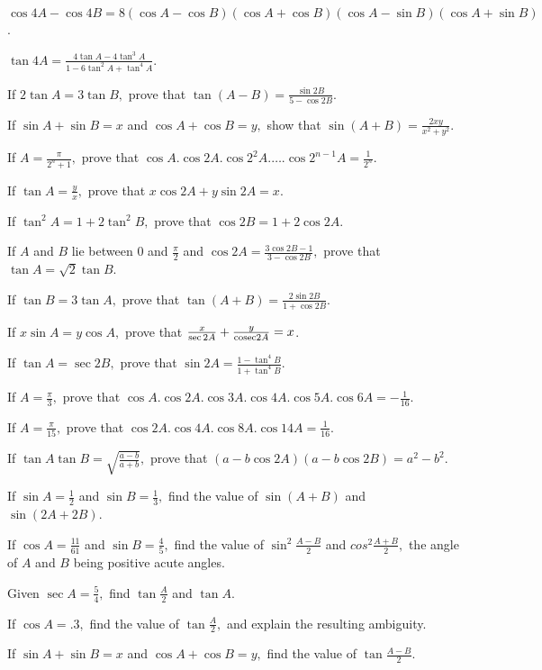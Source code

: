 \item $\cos 4A - \cos 4B = 8(\cos A - \cos B)(\cos A + \cos B)(\cos A - \sin B)(\cos A + \sin B)$.
\item $\tan 4A = \frac{4\tan A - 4\tan^3A}{1 - 6\tan^2A + \tan^4A}$.
\item If $2\tan A = 3\tan B,$ prove that $\tan (A- B) = \frac{\sin 2B}{5 - \cos 2B}$.
\item If $\sin A + \sin B = x$ and $\cos A + \cos B = y,$ show that $\sin(A + B) = \frac{2xy}{x^2 + y^2}$.
\item If $A= \frac{\pi}{2^n + 1},$ prove that $\cos A.\cos 2A. \cos2^2A.\ldots.\cos2^{n - 1}A = \frac{1}{2^n}$.
\item If $\tan A = \frac{y}{x},$ prove that $x\cos 2A + y\sin 2A = x$.
\item If $\tan^2A = 1 + 2\tan^2B,$ prove that $\cos 2B = 1 + 2\cos 2A$.
\item If $A$ and $B$ lie between $0$ and $\frac{\pi}{2}$ and $\cos 2A = \frac{3\cos 2B - 1}{3 - \cos
  2B},$ prove that $\tan A = \sqrt{2}\tan B$.
\item If $\tan B = 3\tan A,$ prove that $\tan(A + B) = \frac{2\sin 2B}{1 + \cos 2B}$.
\item If $x\sin A = y\cos A,$ prove that $\frac{x}{\sec 2A} + \frac{y}{{\rm cosec} 2A} = x$.
\item If $\tan A = \sec 2B,$ prove that $\sin 2A = \frac{1 - \tan^4B}{1 + \tan^4B}$.
\item If $A = \frac{\pi}{3},$ prove that $\cos A.\cos 2A. \cos 3A.\cos 4A.\cos 5A.\cos 6A = -\frac{1}{16}$.
\item If $A = \frac{\pi}{15},$ prove that $\cos2A.\cos4A.\cos8A.\cos14A = \frac{1}{16}$.
\item If $\tan A\tan B = \sqrt{\frac{a - b}{a + b}},$ prove that $(a - b\cos2A)(a - b\cos2B) = a^2 - b^2$.
\item If $\sin A = \frac{1}{2}$ and $\sin B = \frac{1}{3},$ find the value of $\sin(A + B)$ and $\sin(2A +
  2B)$.
\item If $\cos A = \frac{11}{61}$ and $\sin B = \frac{4}{5},$ find the value of $\sin^2 \frac{A - B}{2}$ and
  $cos^2\frac{A + B}{2},$ the angle of $A$ and $B$ being positive acute angles.
\item Given $\sec A = \frac{5}{4},$ find $\tan\frac{A}{2}$ and $\tan A$.
\item If $\cos A = .3,$ find the value of $\tan \frac{A}{2},$ and explain the resulting ambiguity.
\item If $\sin A + \sin B = x$ and $\cos A + \cos B = y,$ find the value of $\tan \frac{A - B}{2}$.
  \stopitemize

